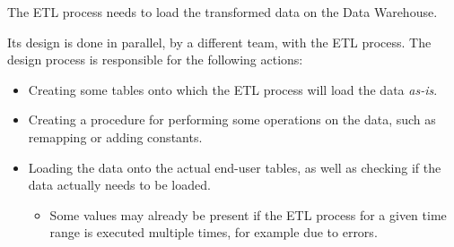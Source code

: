 The ETL process needs to load the transformed data on the Data Warehouse.

Its design is done in parallel, by a different team, with the ETL process.
The design process is responsible for the following actions:
\begin{itemize}
    \item Creating some tables onto which the ETL process will load the data \textit{as-is}.
    
    \item Creating a procedure for performing some operations on the data, such as remapping or adding constants.
    
    \item Loading the data onto the actual end-user tables, as well as checking if the data actually needs to be loaded.
    \begin{itemize}
        \item Some values may already be present if the ETL process for a given time range is executed multiple times, for example due to errors.
    \end{itemize}
\end{itemize}

